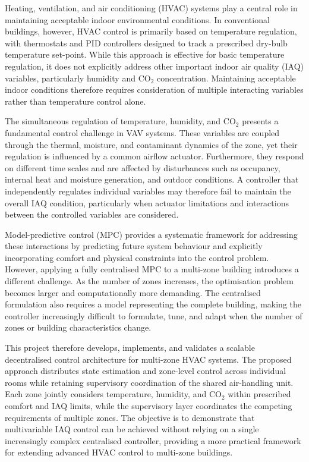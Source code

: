 \documentclass[12pt, a4paper]{article}
\begin{document}
	Heating, ventilation, and air conditioning (HVAC) systems play a central role in maintaining acceptable indoor environmental conditions. In conventional buildings, however, HVAC control is primarily based on temperature regulation, with thermostats and PID controllers designed to track a prescribed dry-bulb temperature set-point. While this approach is effective for basic temperature regulation, it does not explicitly address other important indoor air quality (IAQ) variables, particularly humidity and CO$_2$ concentration. Maintaining acceptable indoor conditions therefore requires consideration of multiple interacting variables rather than temperature control alone.
	
	The simultaneous regulation of temperature, humidity, and CO$_2$ presents a fundamental control challenge in VAV systems. These variables are coupled through the thermal, moisture, and contaminant dynamics of the zone, yet their regulation is influenced by a common airflow actuator. Furthermore, they respond on different time scales and are affected by disturbances such as occupancy, internal heat and moisture generation, and outdoor conditions. A controller that independently regulates individual variables may therefore fail to maintain the overall IAQ condition, particularly when actuator limitations and interactions between the controlled variables are considered.
	
	Model-predictive control (MPC) provides a systematic framework for addressing these interactions by predicting future system behaviour and explicitly incorporating comfort and physical constraints into the control problem. However, applying a fully centralised MPC to a multi-zone building introduces a different challenge. As the number of zones increases, the optimisation problem becomes larger and computationally more demanding. The centralised formulation also requires a model representing the complete building, making the controller increasingly difficult to formulate, tune, and adapt when the number of zones or building characteristics change.
	
	This project therefore develops, implements, and validates a scalable decentralised control architecture for multi-zone HVAC systems. The proposed approach distributes state estimation and zone-level control across individual rooms while retaining supervisory coordination of the shared air-handling unit. Each zone jointly considers temperature, humidity, and CO$_2$ within prescribed comfort and IAQ limits, while the supervisory layer coordinates the competing requirements of multiple zones. The objective is to demonstrate that multivariable IAQ control can be achieved without relying on a single increasingly complex centralised controller, providing a more practical framework for extending advanced HVAC control to multi-zone buildings.
	
\end{document}
